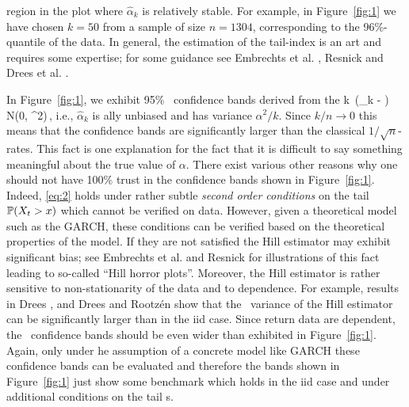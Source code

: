 region in the plot where $\hat \alpha_k$ is relatively
stable. For example, in Figure~\ref{fig:1} we have chosen $k=50$ from
a sample of size $n=1304$, corresponding to the 96\%-quantile of the
data. In general, the estimation of the tail-index is an art and
requires some expertise; for some guidance
see Embrechts et al. \cite{embrechts:klueppelberg:mikosch:1997},
Resnick \cite{resnick:2007} and Drees et al. 
\cite{drees:resnick:2000}. 
\par
In Figure~\ref{fig:1},
we exhibit 95\% \asy\ confidence bands derived from  the \clt
\beam\label{eq:2}
\sqrt k\, \big(\hat \alpha_k - \alpha\big) \std N(0, \alpha^2)\,,
\eeam
i.e., $\hat \alpha_k$ is \asy ally unbiased and has variance
$\alpha^2/k$. Since $k/n\to 0$ this means that the 
confidence bands are significantly larger than the classical
$1/\sqrt{n}$-rates. This fact is one explanation for the fact that it is
difficult to say something meaningful about the true value of
$\alpha$. There exist various other reasons why one should
not have 100\% trust in the confidence bands shown in
Figure~\ref{fig:1}. Indeed, \eqref{eq:2}
holds under rather subtle {\em second order conditions} on the tail
$\P(X_t>x)$ which cannot be verified on data. However, 
given a theoretical model such as the GARCH, these conditions can be
verified based on the theoretical properties of the model. If they are not satisfied the 
Hill estimator may exhibit significant bias; see Embrechts et
al. \cite{embrechts:klueppelberg:mikosch:1997} and Resnick \cite{resnick:1987} for illustrations 
of this fact leading to so-called ``Hill horror plots''. Moreover, the
Hill estimator is rather sensitive to non-stationarity 
of the data and to dependence. For example, results in Drees \cite{drees:2008}, and Drees and
Rootz\'en \cite{drees:rootzen:2010} show that the \asy\ variance of the
Hill estimator can be significantly larger than in the iid case. 
Since return data are dependent, the \asy\ confidence bands should be
even wider than exhibited in Figure~\ref{fig:1}. 
Again, only under he assumption of a concrete model like GARCH these
confidence bands can be evaluated and therefore the bands shown in Figure~\ref{fig:1}
just show some benchmark which holds in the iid case and under additional conditions on the tail \asy s.
